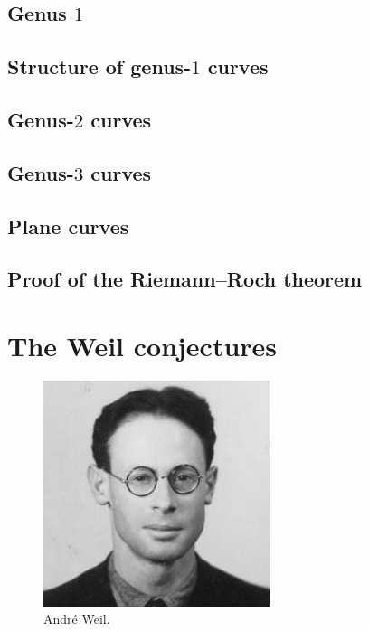 \documentclass [11 pt, oneside] {article}
\begin{document}
\subsection{Genus \texorpdfstring{$1$}{1}}
\subsection{Structure of genus-\texorpdfstring{$1$}{1} curves}
\subsection{Genus-\texorpdfstring{$2$}{2} curves}
\subsection{Genus-\texorpdfstring{$3$}{3} curves}
\subsection{Plane curves}
\subsection{Proof of the Riemann--Roch theorem}


\section{The Weil conjectures}

\begin{figure}
	\begin{center}
		\includegraphics[scale=0.8]{images/weil}
		\caption{Andr\'e Weil.}
	\end{center}
\end{figure}
\end{document}
